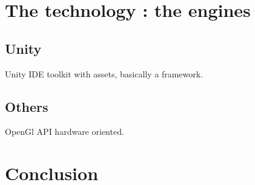\documentclass[a4paper,10pt]{beamer}
\begin{document}
	\section{The technology : the engines}
	
		\subsection{Unity}
		
			\begin{frame}{Unity}
				IDE toolkit with assets, basically a framework.
			\end{frame}
			
		\subsection{Others}
			
			\begin{frame}{OpenGl}
				API hardware oriented.
			\end{frame}
			
	\section{Conclusion}
	
\end{document}
